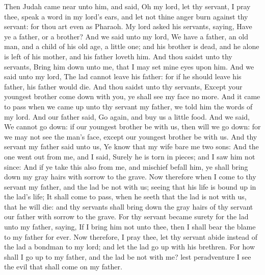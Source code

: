 \begin{biblechapter}
\verse Then Judah came near unto him, and said, Oh my lord, let thy servant, I pray thee, speak a word in my lord's ears, and let not thine anger burn against thy servant: for thou art even as Pharaoh.
\verse My lord asked his servants, saying, Have ye a father, or a brother?
\verse And we said unto my lord, We have a father, an old man, and a child of his old age, a little one; and his brother is dead, and he alone is left of his mother, and his father loveth him.
\verse And thou saidst unto thy servants, Bring him down unto me, that I may set mine eyes upon him.
\verse And we said unto my lord, The lad cannot leave his father: for if he should leave his father, his father would die.
\verse And thou saidst unto thy servants, Except your youngest brother come down with you, ye shall see my face no more.
\verse And it came to pass when we came up unto thy servant my father, we told him the words of my lord.
\verse And our father said, Go again, and buy us a little food.
\verse And we said, We cannot go down: if our youngest brother be with us, then will we go down: for we may not see the man's face, except our youngest brother be with us.
\verse And thy servant my father said unto us, Ye know that my wife bare me two sons:
\verse And the one went out from me, and I said, Surely he is torn in pieces; and I saw him not since:
\verse And if ye take this also from me, and mischief befall him, ye shall bring down my gray hairs with sorrow to the grave.
\verse Now therefore when I come to thy servant my father, and the lad be not with us; seeing that his life is bound up in the lad's life;
\verse It shall come to pass, when he seeth that the lad is not with us, that he will die: and thy servants shall bring down the gray hairs of thy servant our father with sorrow to the grave.
\verse For thy servant became surety for the lad unto my father, saying, If I bring him not unto thee, then I shall bear the blame to my father for ever.
\verse Now therefore, I pray thee, let thy servant abide instead of the lad a bondman to my lord; and let the lad go up with his brethren.
\verse For how shall I go up to my father, and the lad be not with me? lest peradventure I see the evil that shall come on my father.
\end{biblechapter}

